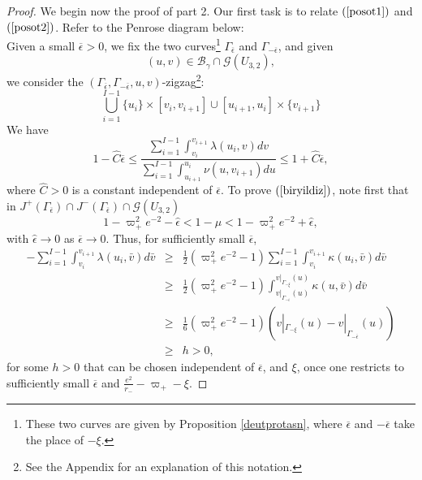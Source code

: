 \documentclass{article}
\begin{document}
{\begin{proof}
We begin now the proof of part 2.
Our first task is to relate $(\ref{posot1})$ and $(\ref{posot2})$.
Refer to the Penrose diagram below:
\[

\]
Given a small $\overline\epsilon>0$, 
we fix the two curves\footnote{These two curves are given by
Proposition \ref{deutprotasn}, where $\overline\epsilon$ and $-\overline\epsilon$
take the place of $-\xi$.} 
$\Gamma_{\overline\epsilon}$
and $\Gamma_{-\overline\epsilon}$, and given 
\[
(u,v)\in
\mathcal{B}_\gamma\cap\mathcal{G}(U_{3,2}),
\]
we consider the $(\Gamma_{\overline\epsilon}, 
\Gamma_{-\overline\epsilon},u,v)$-zigzag\footnote{See the Appendix
for an explanation of this notation.}:
\[
\bigcup_{i=1}^{I-1}\{u_i\}\times[v_i,v_{i+1}]\cup[u_{i+1},u_i]\times\{v_{i+1}\}
\]
We have
\begin{equation}
\label{biryildiz}
1-\hat{C}\overline\epsilon
\le\frac{\sum_{i=1}^{I-1}\int_{v_i}^{v_{i+1}}\lambda(u_i,v) dv}
{\sum_{i=1}^{I-1}\int_{u_{i+1}}^{u_i}\nu(u,v_{i+1}) du}\le
1+\hat{C}\overline\epsilon,
\end{equation}
where $\hat{C}>0$ is a constant independent of $\overline\epsilon$.
To prove $(\ref{biryildiz})$, note first that in 
$J^+(\Gamma_{\overline\epsilon})\cap 
J^-(\Gamma_{\overline\epsilon})\cap
\mathcal{G}(U_{3,2})$
\begin{equation}
\label{notefirst}
1-\varpi_+^2e^{-2}-\hat{\epsilon}
<
1-\mu
<
1-\varpi_+^2e^{-2}+\hat{\epsilon},
\end{equation}
with $\hat\epsilon\to0$ as $\overline\epsilon\to0$. Thus, for
sufficiently small $\overline\epsilon$,
\begin{eqnarray}
\label{aptnmia}
\nonumber
-\sum_{i=1}^{I-1}\int_{v_i}^{v_{i+1}}\lambda(u_i,\bar{v}) d\bar{v}
&\ge&\frac12\left(\varpi_+^2e^{-2}-1\right)
\sum_{i=1}^{I-1}\int_{v_i}^{v_{i+1}}\kappa(u_i,\bar{v}) d\bar{v}\\
\nonumber
&\ge&\frac12\left(\varpi_+^2e^{-2}-1\right)
\int_{v|_{\Gamma_{-\overline\epsilon}}(u)}^{
v|_{\Gamma_{-\xi}}(u)}\kappa(u,\bar{v}) d\bar{v}\\
\nonumber
&\ge&\frac16\left(\varpi_+^2e^{-2}-1\right)
\left(v|_{\Gamma_{-\xi}}(u)-
v|_{\Gamma_{-\overline\epsilon}}(u)\right)\\
&\ge&h>0,
\end{eqnarray}
for some $h>0$ that can be chosen independent of $\overline\epsilon$,
and $\xi$, once one restricts to sufficiently small 
$\overline\epsilon$
and $\frac{e^2}{r_-}-\varpi_+-\xi$.


\end{proof}}
\end{document}
